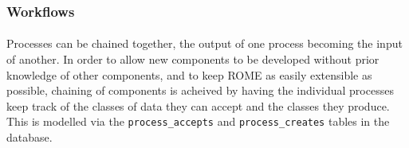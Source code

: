 \subsubsection{Workflows}
\label{sec:workflow}

\paragraph{}
Processes can be chained together, the output of one process becoming the input of another. In order to allow new components to be developed without prior knowledge of other components, and to keep ROME as easily extensible as possible, chaining of components is acheived by having the individual processes keep track of the classes of data they can accept and the classes they produce. This is modelled via the \texttt{process\_accepts} and \texttt{process\_creates} tables in the database. 

% 
